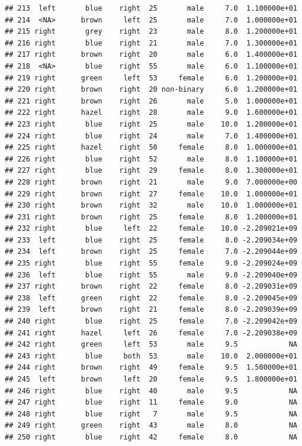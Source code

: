 \documentclass[]{article}
\begin{document}
\begin{verbatim}
## 213  left       blue    right  25       male     7.0  1.100000e+01
## 214  <NA>      brown     left  25       male     7.0  1.000000e+01
## 215 right       grey    right  23       male     8.0  1.200000e+01
## 216 right       blue    right  21       male     7.0  1.300000e+01
## 217 right      brown    right  20       male     6.0  1.400000e+01
## 218  <NA>       blue    right  55       male     6.0  1.100000e+01
## 219 right      green     left  53     female     6.0  1.200000e+01
## 220 right      brown    right  20 non-binary     6.0  1.200000e+01
## 221 right      brown    right  26       male     5.0  1.000000e+01
## 222 right      hazel    right  28       male     9.0  1.600000e+01
## 223 right       blue    right  25       male    10.0  1.200000e+01
## 224 right       blue    right  24       male     7.0  1.400000e+01
## 225 right      hazel    right  50     female     8.0  1.000000e+01
## 226 right       blue    right  52       male     8.0  1.100000e+01
## 227 right       blue    right  29     female     8.0  1.300000e+01
## 228 right      brown    right  21       male     9.0  7.000000e+00
## 229 right      brown    right  27     female    10.0  1.000000e+01
## 230 right      brown    right  32       male    10.0  1.000000e+01
## 231 right      brown    right  25     female     8.0  1.200000e+01
## 232 right       blue     left  22     female    10.0 -2.209021e+09
## 233  left       blue    right  25     female     8.0 -2.209034e+09
## 234  left      brown    right  25     female     7.0 -2.209044e+09
## 235 right       blue    right  55     female     9.0 -2.209024e+09
## 236  left       blue    right  55       male     9.0 -2.209040e+09
## 237 right      brown    right  22     female     8.0 -2.209031e+09
## 238  left      green    right  22     female     8.0 -2.209045e+09
## 239  left      brown    right  21     female     8.0 -2.209039e+09
## 240 right       blue    right  25     female     7.0 -2.209042e+09
## 241 right      hazel     left  26     female     7.0 -2.209038e+09
## 242 right      green     left  53       male     9.5            NA
## 243 right       blue     both  53       male    10.0  2.000000e+01
## 244 right      brown    right  49     female     9.5  1.500000e+01
## 245  left      brown     left  20     female     9.5  1.800000e+01
## 246 right       blue    right  40       male     9.5            NA
## 247 right       blue    right  11     female     9.0            NA
## 248 right       blue    right   7       male     9.5            NA
## 249 right      green    right  43       male     8.0            NA
## 250 right       blue    right  42     female     8.0            NA

\end{verbatim}
\end{document}
